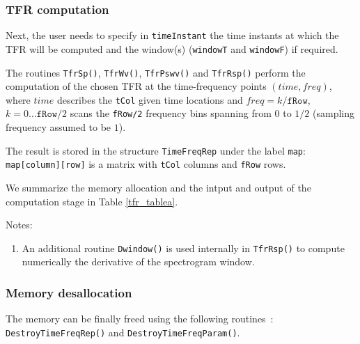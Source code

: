 \documentclass{article}
\begin{document}
\subsubsection{TFR computation}
Next, the user needs to specify in \texttt{timeInstant} the time
instants at which the TFR will be computed and the window(s)
(\texttt{windowT} and \texttt{windowF}) if required.

The routines \texttt{TfrSp()}, \texttt{TfrWv()}, \texttt{TfrPswv()}
and \texttt{TfrRsp()} perform the computation of the chosen TFR at the
time-frequency points $(time,freq)$, where $time$ describes the
\texttt{tCol} given time locations and $freq=k/\mathtt{fRow}$, $k = 0
\ldots\mathtt{fRow}/2$ scans the \texttt{fRow/2} frequency bins
spanning from $0$ to $1/2$ (sampling frequency assumed to be $1$).

The result is stored in the structure \texttt{TimeFreqRep} under the
label \texttt{map}: \texttt{map[column][row]} is a matrix with
\texttt{tCol} columns and \texttt{fRow} rows. 

We summarize the memory allocation and the intput and output of the
computation stage in Table \ref{tfr_tablea}.

\vspace{3mm}
Notes:
\begin{enumerate}
\item An additional routine \texttt{Dwindow()} is used internally in
\texttt{TfrRsp()} to compute numerically the derivative of the
spectrogram window.
\end{enumerate}

\subsubsection{Memory desallocation}
The memory can be finally freed using the following routines~:
\texttt{DestroyTimeFreqRep()} and \texttt{DestroyTimeFreqParam()}.
\end{document}
